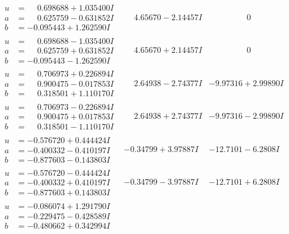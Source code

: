 \documentclass[1p]{elsarticle_modified}
\theoremstyle{definition}
\begin{document}
$$\begin{array}{c|c|c}
\begin{aligned}
u &= \phantom{-}0.698688 + 1.035400 I \\
a &= \phantom{-}0.625759 - 0.631852 I \\
b &= -0.095443 + 1.262590 I\end{aligned}
 & \phantom{-}4.65670 - 2.14457 I & \phantom{-0.000000 } 0 \\ \hline\begin{aligned}
u &= \phantom{-}0.698688 - 1.035400 I \\
a &= \phantom{-}0.625759 + 0.631852 I \\
b &= -0.095443 - 1.262590 I\end{aligned}
 & \phantom{-}4.65670 + 2.14457 I & \phantom{-0.000000 } 0 \\ \hline\begin{aligned}
u &= \phantom{-}0.706973 + 0.226894 I \\
a &= \phantom{-}0.900475 - 0.017853 I \\
b &= \phantom{-}0.318501 + 1.110170 I\end{aligned}
 & \phantom{-}2.64938 - 2.74377 I & -9.97316 + 2.99890 I \\ \hline\begin{aligned}
u &= \phantom{-}0.706973 - 0.226894 I \\
a &= \phantom{-}0.900475 + 0.017853 I \\
b &= \phantom{-}0.318501 - 1.110170 I\end{aligned}
 & \phantom{-}2.64938 + 2.74377 I & -9.97316 - 2.99890 I \\ \hline\begin{aligned}
u &= -0.576720 + 0.444424 I \\
a &= -0.400332 - 0.410197 I \\
b &= -0.877603 - 0.143803 I\end{aligned}
 & -0.34799 + 3.97887 I & -12.7101 - 6.2808 I \\ \hline\begin{aligned}
u &= -0.576720 - 0.444424 I \\
a &= -0.400332 + 0.410197 I \\
b &= -0.877603 + 0.143803 I\end{aligned}
 & -0.34799 - 3.97887 I & -12.7101 + 6.2808 I \\ \hline\begin{aligned}
u &= -0.086074 + 1.291790 I \\
a &= -0.229475 - 0.428589 I \\
b &= -0.480662 + 0.342994 I\end{aligned}

\end{array}$$
\end{document}
